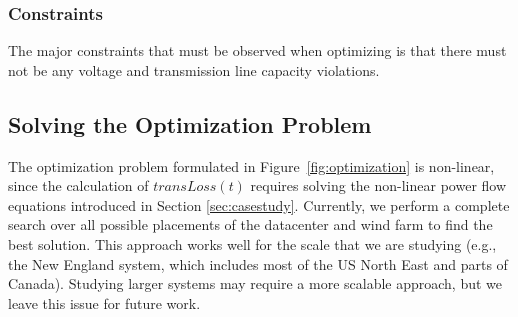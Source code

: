 

\subsubsection{Constraints}
The major constraints that must be observed when optimizing is that
there must not be any voltage and transmission line capacity
violations.



\subsection{Solving the Optimization Problem}

The optimization problem formulated in Figure~\ref{fig:optimization} is non-linear, since the calculation of $transLoss(t)$ requires solving the non-linear power flow equations introduced in Section \ref{sec:casestudy}.  Currently, we perform a complete search over all possible placements of the datacenter and wind farm to find the best solution.  This approach works well for the scale that we are studying (e.g., the New England system, which includes most of the US North East and parts of Canada).  Studying larger systems may require a more scalable approach, but we leave this issue for future work.

